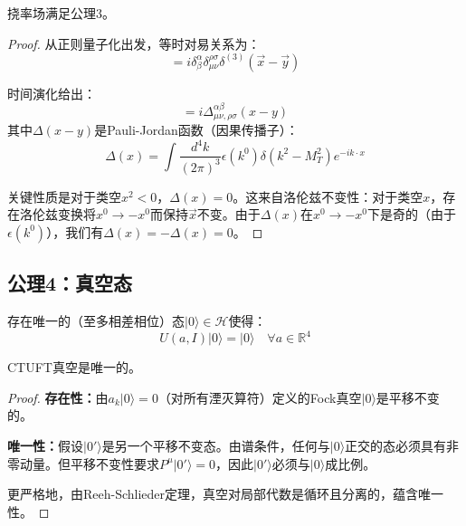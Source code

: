 \begin{theorem}[微观因果性]
挠率场满足公理3。
\end{theorem}

\begin{proof}
从正则量子化出发，等时对易关系为：
\begin{equation}
    [\mathcal{T}^\alpha_{\mu\nu}(t, \vec{x}), \pi_\beta^{\rho\sigma}(t, \vec{y})] = i\delta^\alpha_\beta \delta^{\rho\sigma}_{\mu\nu} \delta^{(3)}(\vec{x} - \vec{y})
\end{equation}

时间演化给出：
\begin{equation}
    [\mathcal{T}^\alpha_{\mu\nu}(x), \mathcal{T}^\beta_{\rho\sigma}(y)] = i\Delta^{\alpha\beta}_{\mu\nu,\rho\sigma}(x-y)
\end{equation}
其中$\Delta(x-y)$是Pauli-Jordan函数（因果传播子）：
\begin{equation}
    \Delta(x) = \int \frac{d^4k}{(2\pi)^3} \epsilon(k^0) \delta(k^2 - M_T^2) e^{-ik \cdot x}
\end{equation}

关键性质是对于类空$x^2 < 0$，$\Delta(x) = 0$。这来自洛伦兹不变性：对于类空$x$，存在洛伦兹变换将$x^0 \to -x^0$而保持$\vec{x}$不变。由于$\Delta(x)$在$x^0 \to -x^0$下是奇的（由于$\epsilon(k^0)$），我们有$\Delta(x) = -\Delta(x) = 0$。
\end{proof}

\subsection{公理4：真空态}

\begin{axiom}[真空态]
存在唯一的（至多相差相位）态$|0\rangle \in \mathcal{H}$使得：
\begin{equation}
    U(a, I)|0\rangle = |0\rangle \quad \forall a \in \mathbb{R}^4
\end{equation}
\end{axiom}

\begin{theorem}[真空的唯一性]
CTUFT真空是唯一的。
\end{theorem}

\begin{proof}
\textbf{存在性：}由$a_k |0\rangle = 0$（对所有湮灭算符）定义的Fock真空$|0\rangle$是平移不变的。

\textbf{唯一性：}假设$|0'\rangle$是另一个平移不变态。由谱条件，任何与$|0\rangle$正交的态必须具有非零动量。但平移不变性要求$P^\mu |0'\rangle = 0$，因此$|0'\rangle$必须与$|0\rangle$成比例。

更严格地，由Reeh-Schlieder定理，真空对局部代数是循环且分离的，蕴含唯一性。
\end{proof}

